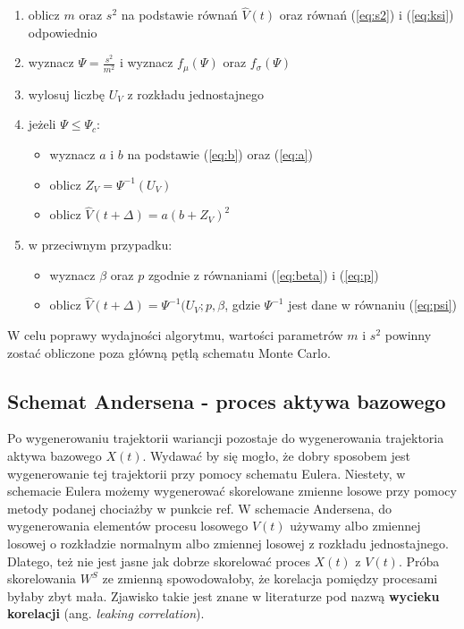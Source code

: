 \documentclass{pracamgr}
\begin{document}
\begin{enumerate}
  \item oblicz $m$ oraz $s^2$ na podstawie równań $\hat{V}(t)$ oraz równań (\ref{eq:s2}) i (\ref{eq:ksi}) odpowiednio
  \item wyznacz $\Psi = \frac{s^2}{m^2}$ i wyznacz $f_{\mu}(\Psi)$ oraz $f_{\sigma}(\Psi)$ 
  \item wylosuj liczbę $U_V$ z rozkładu jednostajnego
  \item jeżeli $\Psi \leq \Psi_c$:
  \begin{itemize} 
  \item wyznacz $a$ i $b$ na podstawie (\ref{eq:b}) oraz (\ref{eq:a})
  \item oblicz $Z_V = \Psi^{-1}(U_V)$
  \item oblicz $\hat{V}(t + \Delta)  = a(b+ Z_V)^2$
  \end{itemize}
  \item w przeciwnym przypadku:
    \begin{itemize} 
  \item wyznacz $\beta$ oraz $p$ zgodnie z równaniami (\ref{eq:beta}) i (\ref{eq:p})
  \item oblicz $\hat{V}(t + \Delta)  =\Psi^{-1}(U_V;p,\beta$, gdzie $\Psi^{-1}$ jest dane w równaniu (\ref{eq:psi})
  \end{itemize}
  
\end{enumerate}


W celu poprawy wydajności algorytmu, wartości parametrów $m$ i $s^2$ powinny zostać obliczone poza główną pętlą schematu Monte Carlo.



\subsection{Schemat Andersena - proces aktywa bazowego}

Po wygenerowaniu trajektorii wariancji pozostaje do wygenerowania trajektoria aktywa bazowego $X(t)$. Wydawać by się mogło, że dobry sposobem jest wygenerowanie tej trajektorii przy pomocy schematu Eulera. Niestety, w schemacie Eulera możemy wygenerować skorelowane zmienne losowe
przy pomocy metody podanej chociażby w punkcie ref.
W schemacie Andersena, do wygenerowania elementów procesu losowego $V(t)$ używamy albo zmiennej losowej o rozkładzie normalnym albo zmiennej losowej z rozkładu jednostajnego. Dlatego, też nie jest jasne jak dobrze skorelować proces $X(t)$ z $V(t)$. Próba skorelowania $W^S$ ze zmienną spowodowałoby, że korelacja pomiędzy procesami byłaby zbyt mała. Zjawisko takie jest znane w literaturze pod nazwą \textbf{wycieku korelacji} (ang. \textit{leaking correlation}). 
\end{document}

